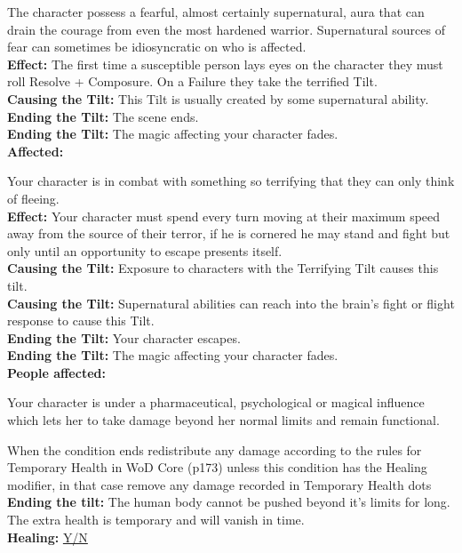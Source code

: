\documentclass[10pt, frontgrid, backgrid]{flacards}
\begin{document}
{The character possess a fearful, almost certainly supernatural, aura that can drain the courage from even the most hardened warrior. Supernatural sources of fear can sometimes be idiosyncratic on who is affected. \\
\textbf{Effect:} The first time a susceptible person lays eyes on the character they must roll Resolve + Composure. On a Failure they take the terrified Tilt.\\
\textbf{Causing the Tilt:} This Tilt is usually created by some supernatural ability. \\
\textbf{Ending the Tilt:} The scene ends.\\
\textbf{Ending the Tilt:} The magic affecting your character fades.\\
\textbf{Affected:} \fillunderline
}

{Your character is in combat with something so terrifying that they can only think of fleeing. \\
\textbf{Effect:} Your character must spend every turn moving at their maximum speed away from the source of their terror, if he is cornered he may stand and fight but only until an opportunity to escape presents itself.\\
\textbf{Causing the Tilt:} Exposure to characters with the Terrifying Tilt causes this tilt.\\
\textbf{Causing the Tilt:} Supernatural abilities can reach into the brain's fight or flight response to cause this Tilt.\\
\textbf{Ending the Tilt:} Your character escapes. \\
\textbf{Ending the Tilt:} The magic affecting your character fades. \\
\textbf{People affected:} \fillunderline}

{Your character is under a pharmaceutical, psychological or magical influence which lets her to take damage beyond her normal limits and remain functional. 

When the condition ends redistribute any damage according to the rules  for Temporary Health in WoD Core (p173) unless this condition has the Healing modifier, in that case remove any damage recorded in Temporary Health dots\\
\textbf{Ending the tilt:} The human body cannot be pushed beyond it's limits for long. The extra health is temporary and will vanish in time. \\
\textbf{Healing:} \underline{Y/N}}
\end{document}
